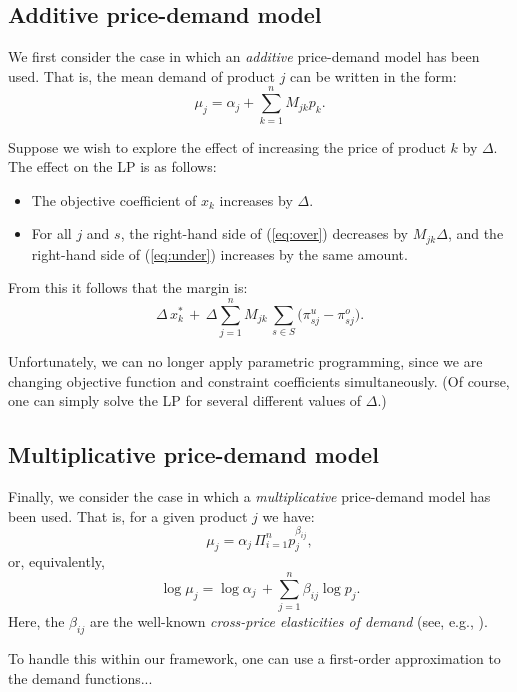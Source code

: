 \documentclass[a4paper,11pt]{article}
\begin{document}
\subsection{Additive price-demand model} \label{sub:price1}

We first consider the case in which an \emph{additive} price-demand model has been used. That is, the mean demand of product $j$ can be written in the form:
\[
\mu_j = \alpha_j + \sum_{k=1}^n M_{jk} p_k.
\]

Suppose we wish to explore the effect of increasing the price of product $k$ by $\Delta$. The effect on the LP is as follows:
\begin{itemize}
\item The objective coefficient of $x_k$ increases by $\Delta$.
\item For all $j$ and $s$, the right-hand side of (\ref{eq:over}) decreases by $M_{jk} \Delta$, and the right-hand side of (\ref{eq:under}) increases by the same amount.
\end{itemize}
From this it follows that the margin is:
\[
\Delta \, x^*_k \, + \,
\Delta \sum_{j=1}^n M_{jk} \, \sum_{s \in S} \big( \pi_{sj}^u - \pi_{sj}^o \big).
\]

Unfortunately, we can no longer apply parametric programming, since we are changing objective function and constraint coefficients simultaneously. (Of course, one can simply solve the LP for several different values of $\Delta$.)

\subsection{Multiplicative price-demand model} \label{sub:price2}

Finally, we consider the case in which a \emph{multiplicative} price-demand model has been used. That is, for a given product $j$ we have:
\[
\mu_j = \alpha_j \, \Pi_{i=1}^n p_j^{\beta_{ij}},
\]
or, equivalently,
\[
\log \mu_j = \log \alpha_j \, + \sum_{j=1}^n \beta_{ij} \log p_j.
\]
Here, the $\beta_{ij}$ are the well-known
\emph{cross-price elasticities of demand} (see, e.g., \cite{FC13}).

To handle this within our framework, one can use a first-order approximation to the demand functions...
\end{document}
